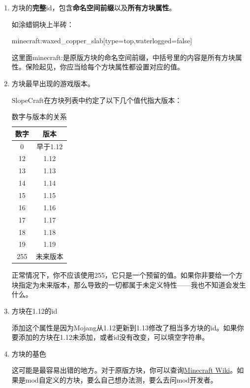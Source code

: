 \documentclass[UTF8]{ctexart}
\begin{document}
\begin{enumerate}
    \item 方块的\textbf{完整}id，包含\textbf{命名空间前缀}以及\textbf{所有方块属性}。

          如涂蜡铜块上半砖：

          minecraft:waxed\_copper\_slab[type=top,waterlogged=false]

          这里面minecraft:是原版方块的命名空间前缀，中括号里的内容是所有方块属性。保险起见，你应当给每个方块属性都设置对应的值。
    \item 方块最早出现的游戏版本。

          SlopeCraft在方块列表中约定了以下几个值代指大版本：
          \begin{table}[h]
              \centering
              \caption{数字与版本的关系}
              \label{VerAndRealVer}
              \begin{tabular}{cc}\hline
                  数字 & 版本     \\ \hline
                  0    & 早于1.12 \\
                  12   & 1.12     \\
                  13   & 1.13     \\
                  14   & 1.14     \\
                  15   & 1.15     \\
                  16   & 1.16     \\
                  17   & 1.17     \\
                  18   & 1.18     \\
                  19   & 1.19     \\
                  255  & 未来版本 \\
                  \hline
              \end{tabular}
          \end{table}

          正常情况下，你不应该使用255，它只是一个预留的值。如果你非要给一个方块指定为未来版本，那么导致的一切都属于未定义特性——我也不知道会发生什么。

    \item 方块在1.12的id

          添加这个属性是因为Mojang从1.12更新到1.13修改了相当多方块的id。如果你要添加的方块在1.12未添加，或者id没有改变，可以填空字符串。
    \item 方块的基色

          这可能是最容易出错的地方。对于原版方块，你可以查询\href{https://wiki.biligame.com/mc/%E5%9C%B0%E5%9B%BE%E7%89%A9%E5%93%81%E6%A0%BC%E5%BC%8F#idcounts.dat_.E6.A0.BC.E5.BC.8F}{Minecraft Wiki}。如果是mod自定义的方块，要么自己想办法测，要么去问mod开发者。


\end{enumerate}
\end{document}
